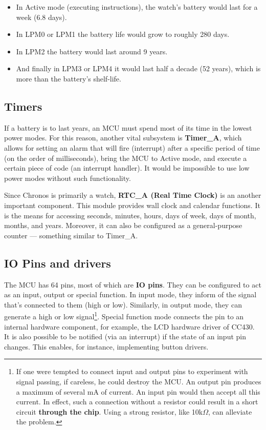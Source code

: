 \begin{itemize}
    \item In Active mode (executing instructions), the watch's battery
      would last for a week (6.8 days).
    \item In LPM0 or LPM1 the battery life would grow to roughly 280 days.
    \item In LPM2 the battery would last around 9 years.
    \item And finally in LPM3 or LPM4 it would last half a decade (52
    years), which is more than the battery's shelf-life.
\end{itemize}

\subsection{Timers}
If a battery is to last years, an MCU must spend most of its time in
the lowest power modes.
For this reason, another vital subsystem is {\bf Timer\_A}, which
allows for setting an alarm that will fire (interrupt) after a specific period
of time (on the order of milliseconds), bring the MCU to Active mode, and
execute a certain piece of code (an interrupt handler). It would be impossible
to use low power modes without such functionality.

Since Chronos is primarily a watch, {\bf RTC\_A (Real Time Clock)} is
an another important component. This module provides wall clock and
calendar functions. It is the means for accessing seconds, minutes,
hours, days of week, days of month, months, and years.  Moreover, it
can also be configured as a general-purpose counter --- something
similar to Timer\_A.

\subsection{IO Pins and drivers}
The MCU has 64 pins, most of which are {\bf IO pins}. They can be
configured to act as an input, output or special function.  In input
mode, they inform of the signal that's connected to them (high or
low). Similarly, in output mode, they can generate a high or low
signal\footnote{If one were tempted to connect input and output pins
to experiment with signal passing, if careless, he could destroy the
MCU.  An output pin produces a maximum of several mA of current. An
input pin would then accept all this current. In effect, such a
connection without a resistor could result in a short circuit {\bf
through the chip}. Using a strong resistor, like 10k$\Omega$, can alleviate the
problem.}. Special function mode connects the pin to an internal
hardware component, for example, the LCD hardware driver of CC430.  It is also possible
to be notified (via an interrupt) if the state of an input pin changes.
This enables, for instance, implementing button drivers.

